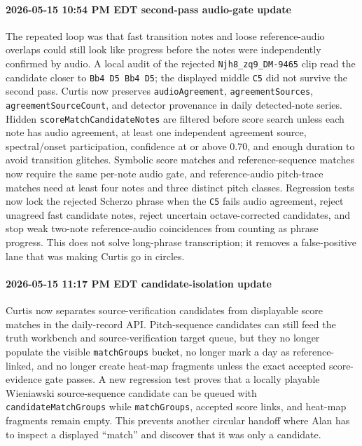\paragraph{2026-05-15 10:54 PM EDT second-pass audio-gate update} The repeated loop was that fast transition notes and loose reference-audio overlaps could still look like progress before the notes were independently confirmed by audio. A local audit of the rejected \texttt{Njh8\_zq9\_DM-9465} clip read the candidate closer to \texttt{Bb4 D5 Bb4 D5}; the displayed middle \texttt{C5} did not survive the second pass. Curtis now preserves \texttt{audioAgreement}, \texttt{agreementSources}, \texttt{agreementSourceCount}, and detector provenance in daily detected-note series. Hidden \texttt{scoreMatchCandidateNotes} are filtered before score search unless each note has audio agreement, at least one independent agreement source, spectral/onset participation, confidence at or above 0.70, and enough duration to avoid transition glitches. Symbolic score matches and reference-sequence matches now require the same per-note audio gate, and reference-audio pitch-trace matches need at least four notes and three distinct pitch classes. Regression tests now lock the rejected Scherzo phrase when the \texttt{C5} fails audio agreement, reject unagreed fast candidate notes, reject uncertain octave-corrected candidates, and stop weak two-note reference-audio coincidences from counting as phrase progress. This does not solve long-phrase transcription; it removes a false-positive lane that was making Curtis go in circles.

\paragraph{2026-05-15 11:17 PM EDT candidate-isolation update} Curtis now separates source-verification candidates from displayable score matches in the daily-record API. Pitch-sequence candidates can still feed the truth workbench and source-verification target queue, but they no longer populate the visible \texttt{matchGroups} bucket, no longer mark a day as reference-linked, and no longer create heat-map fragments unless the exact accepted score-evidence gate passes. A new regression test proves that a locally playable Wieniawski source-sequence candidate can be queued with \texttt{candidateMatchGroups} while \texttt{matchGroups}, accepted score links, and heat-map fragments remain empty. This prevents another circular handoff where Alan has to inspect a displayed ``match'' and discover that it was only a candidate.

